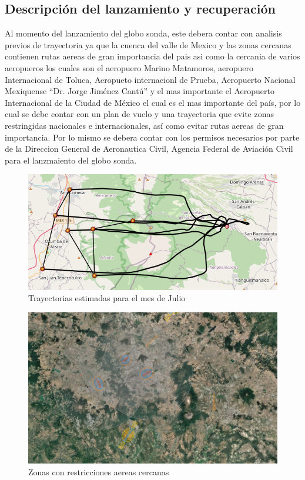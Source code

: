 \documentclass[letterpaper,12pt]{article} %
\begin{document}
    \subsection{Descripción del lanzamiento y recuperación}

    Al momento del lanzamiento del globo sonda, este debera contar con analisis previos
    de trayectoria ya que la cuenca del valle de Mexico y las zonas cercanas contienen rutas
    aereas de gran importancia del pais asi como la cercania de varios aeropueros los cuales 
    son el aeropuero Marino Matamoros, aeropuero Internacional de Toluca, Aeropueto internacionl de Prueba, Aeropuerto Nacional Mexiquense “Dr. Jorge Jiménez Cantú”
    y el mas importante el Aeropuerto Internacional de la Ciudad de México el cual es el
    mas importante del país, por lo cual se debe contar con un plan de vuelo y una trayectoria 
    que evite zonas restringidas nacionales e internacionales, así como evitar rutas aereas de gran importancia.
    Por lo mismo se debera contar con los permisos necesarios por parte de la Direccion General de Aeronautica Civil,
    Agencia Federal de Aviación Civil para el lanzmaiento del globo sonda.

    \begin{figure}[H]
      \centerline{\includegraphics[width=1\textwidth]{Tray.png}}
      \caption{Trayectorias estimadas para el mes de Julio}
      \label{fig:Trayectoria}
    \end{figure}

    \begin{figure}[H]
      \centerline{\includegraphics[width=.8\textwidth]{Zonas.png}}
      \caption{Zonas con restricciones aereas cercanas}
      \label{fig:Zonas}
    \end{figure}
\end{document}
